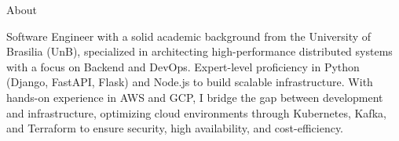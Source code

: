 \documentclass{resume} %
\begin{document}

\begin{rSection}{About}

\begin{rSubsection}{}{}{}{}
\item Software Engineer with a solid academic background from the University of Brasilia (UnB), specialized in architecting high-performance 
distributed systems with a focus on Backend and DevOps. Expert-level proficiency in Python (Django, FastAPI, Flask) and Node.js to build scalable 
infrastructure. With hands-on experience in AWS and GCP, I bridge the gap between development and infrastructure, optimizing cloud environments 
through Kubernetes, Kafka, and Terraform to ensure security, high availability, and cost-efficiency.
\end{rSubsection}
\end{rSection}

\end{document}
